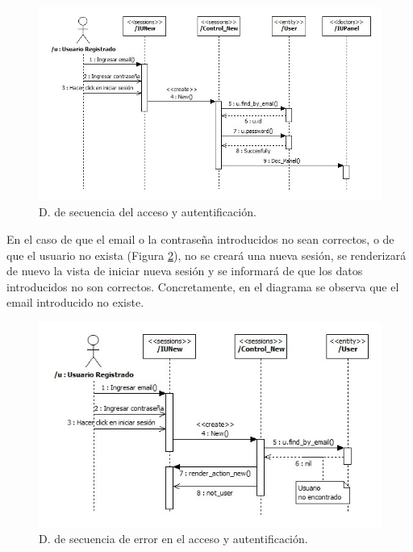 					\begin{figure}[H]
					  \centering
					    \includegraphics[width=14.5cm]{img/jpg/secuencia/18_user_login.jpg}
					  \caption{D. de secuencia del acceso y autentificación.}
					  \label{fig:cont_user_login}
					\end{figure}
				
				En el caso de que el email o la contraseña introducidos no sean correctos, o de que el usuario no exista (Figura \ref{fig:cont_user_login_error}), no se creará una nueva sesión, se renderizará de nuevo la vista de iniciar nueva sesión y se informará de que los datos introducidos no son correctos. Concretamente, en el diagrama se observa que el email introducido no existe.
				
					\begin{figure}[H]
					  \centering
					    \includegraphics[width=12.5cm]{img/jpg/secuencia/19_user_login_error.jpg}
					  \caption{D. de secuencia de error en el acceso y autentificación.}
					  \label{fig:cont_user_login_error}
					\end{figure}
				
